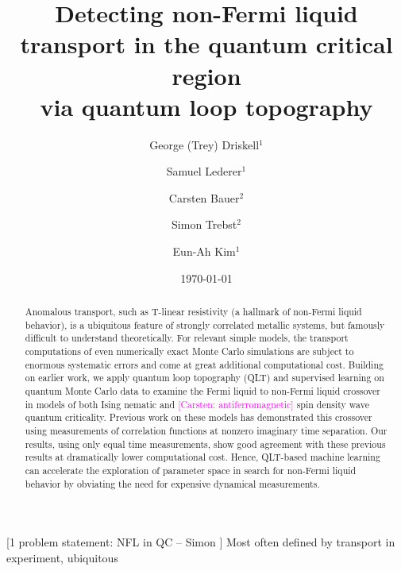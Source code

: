 \documentclass[amsmath,amssymb, aps, prx, longbibliography, twocolumn]{revtex4-1}
\newcommand{\cb}[1]{\textcolor{magenta}{[Carsten: #1]}}
\begin{document}
\title{ Detecting non-Fermi liquid transport in the quantum critical region \\ via quantum loop topography}

\author{George (Trey) Driskell$^1$}
\author{Samuel Lederer$^1$}
\author{Carsten Bauer$^2$}
\author{Simon Trebst$^2$}
\author{Eun-Ah Kim$^1$}

%

\date{\today}

\begin{abstract}
Anomalous transport, such as T-linear resistivity (a hallmark of non-Fermi liquid behavior), is a ubiquitous feature of strongly correlated metallic systems, but famously difficult to understand theoretically. For relevant simple models, the transport computations of even numerically exact Monte Carlo simulations are subject to enormous systematic errors and come at great additional computational cost. Building on earlier work, we apply quantum loop topography (QLT) and supervised learning on quantum Monte Carlo data to examine the Fermi liquid to non-Fermi liquid crossover in models of both Ising nematic and \cb{antiferromagnetic} spin density wave quantum criticality. Previous work on these models has demonstrated this crossover using measurements of correlation functions at nonzero imaginary time separation. Our results, using only equal time measurements, show good agreement with these previous results at dramatically lower computational cost. Hence, QLT-based machine learning can accelerate the exploration of parameter space in search for non-Fermi liquid behavior by obviating the need for expensive dynamical measurements.
\end{abstract}

\maketitle

[1 problem statement: NFL in QC -- Simon ]
Most often defined by transport in experiment, ubiquitous
\\
\\
\\
\\
\\
\\
\\
\\
\\
\\
\\
\end{document}
